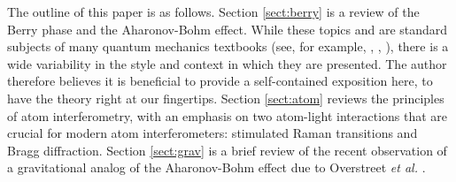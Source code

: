 \documentclass[reprint,
nofootinbib,
amsmath,amssymb,
aps]{revtex4-1}
\begin{document}
The outline of this paper is as follows.  Section \ref{sect:berry} is a review of the Berry phase and the Aharonov-Bohm effect. While these topics and are standard subjects of many quantum mechanics textbooks (see, for example, \cite{shankar2012principles}, \cite{griffiths2018introduction}, \cite{sakurai1995modern}), there is a wide variability in the style and context in which they are presented. The author therefore believes it is beneficial to provide a self-contained exposition here, to have the theory right at our fingertips. Section \ref{sect:atom} reviews the principles of atom interferometry, with an emphasis on two atom-light interactions that are crucial for modern atom interferometers: stimulated Raman transitions and Bragg diffraction. Section \ref{sect:grav} is a brief review of the recent observation of a gravitational analog of the Aharonov-Bohm effect due to Overstreet \textit{et al.} \cite{overstreet2022observation}.
\end{document}
